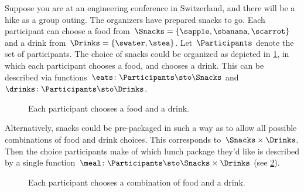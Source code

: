 Suppose you are at an engineering conference in Switzerland, and there will be a hike as a group outing.
The organizers have prepared snacks to go.
Each participant can choose a food from~$\Snacks=\{\sapple,\sbanana,\scarrot\}$ and a drink from~$\Drinks=\{\swater,\stea\}$.
Let~$\Participants$ denote the set of participants. 
The choice of snacks could be organized as depicted in \cref{fig:snacks_1}, in which each participant chooses a food, and chooses a drink.
This can be described via functions~$\eats \colon \Participants \sto \Snacks$ and~$\drinks \colon  \Participants \sto \Drinks$.

\begin{figure}[h!]
  \begin{center}
  \end{center}
  \caption{Each participant chooses a food and a drink.}
  \label{fig:snacks_1}
\end{figure}

Alternatively, snacks could be pre-packaged in such a way as to allow all possible combinations of food and drink choices. This corresponds to~$\Snacks\times \Drinks$.
Then the choice participants make of which lunch package they'd like is described by a single function~$\meal \colon \Participants\sto \Snacks\times \Drinks$ (see \cref{fig:snacks_2}).

\begin{figure}[h!]
  \begin{center}
  \end{center}
  \caption{Each participant chooses a combination of food and a drink. \label{fig:snacks_2}}
\end{figure}


